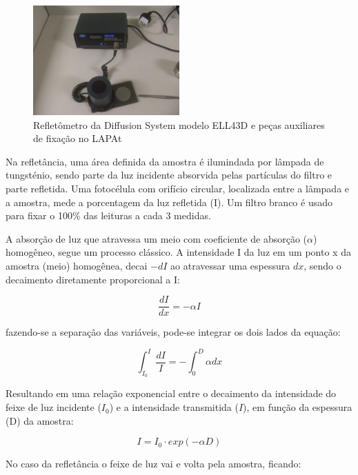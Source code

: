 \begin{figure}[H]
  \centering
  \includegraphics[width=0.5\textwidth]{../inputs/images/refletometro.jpg}
  \caption{Refletômetro da Diffusion System modelo ELL43D 
           e peças auxiliares de fixação no LAPAt}
\end{figure}

Na refletância, uma área definida da amostra é ilumindada por lâmpada de 
tungsténio, sendo parte da luz incidente absorvida pelas partículas do 
filtro e parte refletida. Uma fotocélula com orifício circular, localizada
entre a lâmpada e a amostra, mede a porcentagem da luz refletida (I).
Um filtro branco é usado para fixar o 100\% das leituras a cada 3 medidas.

A absorção de luz que atravessa um meio com coeficiente de absorção ($\alpha$) 
homogêneo, segue um processo clássico. A intensidade I da luz em um ponto x da
amostra (meio) homogênea, decai $-dI$ ao atravessar uma espessura $dx$, 
sendo o decaimento diretamente proporcional a I:

\begin{equation}
  \label{eq:dIdx}
   \frac{dI}{dx} = -\alpha I
\end{equation}

fazendo-se a separação das variáveis, pode-se integrar os dois lados da equação:

\begin{equation}
  \int_{I_0}^{I} \frac{dI}{I} = - \int_{0}^{D} \alpha dx
\end{equation}

Resultando em uma relação exponencial entre o decaimento da intensidade do feixe
de luz incidente ($I_0$) e a intensidade transmitida ($I$), 
em função da espessura (D) da amostra:

\begin{equation}
  \label{eq:I_BC}
  I = I_0 \cdot exp(-\alpha D)
\end{equation}

No caso da refletância o feixe de luz vai e volta pela amostra, ficando:

